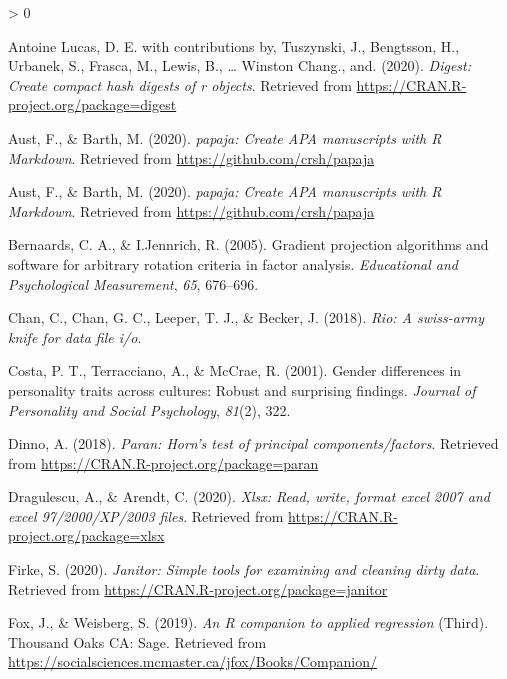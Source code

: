 \documentclass[
  english,
  man, fleqn, noextraspace]{apa6}
\newlength{\cslhangindent}
\newenvironment{CSLReferences}[2] %
 {%
  \setlength{\parindent}{0pt}
  \ifodd #1 \everypar{\setlength{\hangindent}{\cslhangindent}}\ignorespaces\fi
  \ifnum #2 > 0
  \setlength{\parskip}{#2\baselineskip}
  \fi
 }%
 {}
\begin{document}
\begingroup
\setlength{\parindent}{-0.5in}
\setlength{\leftskip}{0.5in}

\hypertarget{refs}{}
\begin{CSLReferences}{1}{0}
\leavevmode\hypertarget{ref-R-digest}{}%
Antoine Lucas, D. E. with contributions by, Tuszynski, J., Bengtsson, H., Urbanek, S., Frasca, M., Lewis, B., \ldots{} Winston Chang., and. (2020). \emph{Digest: Create compact hash digests of r objects}. Retrieved from \url{https://CRAN.R-project.org/package=digest}

\leavevmode\hypertarget{ref-R-papaja}{}%
Aust, F., \& Barth, M. (2020). \emph{{papaja}: {Create} {APA} manuscripts with {R Markdown}}. Retrieved from \url{https://github.com/crsh/papaja}

\leavevmode\hypertarget{ref-R-papaja}{}%
Aust, F., \& Barth, M. (2020). \emph{{papaja}: {Create} {APA} manuscripts with {R Markdown}}. Retrieved from \url{https://github.com/crsh/papaja}

\leavevmode\hypertarget{ref-R-GPArotation}{}%
Bernaards, C. A., \& I.Jennrich, R. (2005). Gradient projection algorithms and software for arbitrary rotation criteria in factor analysis. \emph{Educational and Psychological Measurement}, \emph{65}, 676--696.

\leavevmode\hypertarget{ref-R-rio}{}%
Chan, C., Chan, G. C., Leeper, T. J., \& Becker, J. (2018). \emph{Rio: A swiss-army knife for data file i/o}.

\leavevmode\hypertarget{ref-costa2001}{}%
Costa, P. T., Terracciano, A., \& McCrae, R. (2001). Gender differences in personality traits across cultures: Robust and surprising findings. \emph{Journal of Personality and Social Psychology}, \emph{81}(2), 322.

\leavevmode\hypertarget{ref-R-paran}{}%
Dinno, A. (2018). \emph{Paran: Horn's test of principal components/factors}. Retrieved from \url{https://CRAN.R-project.org/package=paran}

\leavevmode\hypertarget{ref-R-xlsx}{}%
Dragulescu, A., \& Arendt, C. (2020). \emph{Xlsx: Read, write, format excel 2007 and excel 97/2000/XP/2003 files}. Retrieved from \url{https://CRAN.R-project.org/package=xlsx}

\leavevmode\hypertarget{ref-R-janitor}{}%
Firke, S. (2020). \emph{Janitor: Simple tools for examining and cleaning dirty data}. Retrieved from \url{https://CRAN.R-project.org/package=janitor}

\leavevmode\hypertarget{ref-R-car}{}%
Fox, J., \& Weisberg, S. (2019). \emph{An {R} companion to applied regression} (Third). Thousand Oaks {CA}: Sage. Retrieved from \url{https://socialsciences.mcmaster.ca/jfox/Books/Companion/}


\end{CSLReferences}
\end{document}
